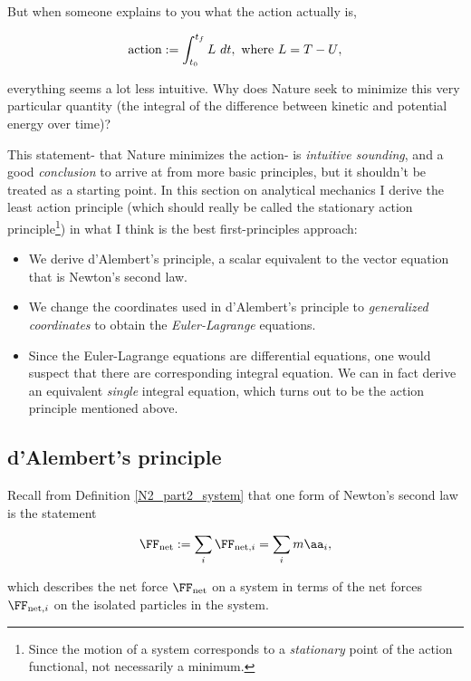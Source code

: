 \documentclass{article}
\begin{document}
But when someone explains to you what the action actually is,

\begin{align*}
    \text{action} := \int_{t_0}^{t_f} L \text{ } dt, \text{ where $L = T - U$},
\end{align*}

everything seems a lot less intuitive. Why does Nature seek to minimize this very particular quantity (the integral of the difference between kinetic and potential energy over time)? 

This statement- that Nature minimizes the action- is \textit{intuitive sounding}, and a good \textit{conclusion} to arrive at from more basic principles, but it shouldn't be treated as a starting point. In this section on analytical mechanics I derive the least action principle (which should really be called the stationary action principle\footnote{Since the motion of a system corresponds to a \textit{stationary} point of the action functional, not necessarily a minimum.}) in what I think is the best first-principles approach:

\begin{itemize}
    \item We derive d'Alembert's principle, a scalar equivalent to the vector equation that is Newton's second law.
    \item We change the coordinates used in d'Alembert's principle to \textit{generalized coordinates} to obtain the \textit{Euler-Lagrange} equations.
    \item Since the Euler-Lagrange equations are differential equations, one would suspect that there are corresponding integral equation. We can in fact derive  an equivalent \textit{single} integral equation, which turns out to be the action principle mentioned above.
\end{itemize}

\subsection*{d'Alembert's principle}

Recall from Definition \ref{N2_part2_system} that one form of Newton's second law is the statement

\begin{align*}
    \FF_{\text{net}} := \sum_i \FF_{\text{net}, i} = \sum_i m \aa_i,
\end{align*}

which describes the net force $\FF_{\text{net}}$ on a system in terms of the net forces $\FF_{\text{net}, i}$ on the isolated particles in the system.
\end{document}
